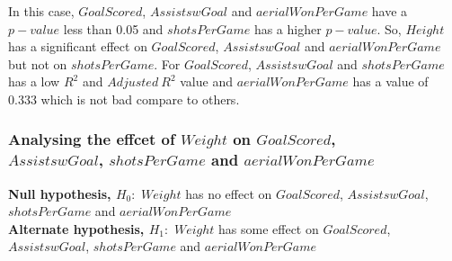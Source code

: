 \documentclass[12pt]{article}
\begin{document}
In this case, $ GoalScored $, $ AssistswGoal $ and $ aerialWonPerGame $ have a $ p-value $ less than 0.05 and $ shotsPerGame $ has a higher $ p-value $. So, $ Height $ has a significant effect on $ GoalScored $, $ AssistswGoal $ and $ aerialWonPerGame $ but not on $ shotsPerGame $. For $ GoalScored $, $ AssistswGoal $ and $ shotsPerGame $ has a low $ R^2 $ and $ Adjusted ~ R^2 $ value and $ aerialWonPerGame $ has a value of 0.333 which is not bad compare to others.

\newpage

\subsubsection{Analysing the effcet of $ Weight $ on $ GoalScored $, \\ $ AssistswGoal $, $ shotsPerGame $ and $ aerialWonPerGame $}

\textbf{Null hypothesis, $ H_0: $} $ Weight $ has no effect on $ GoalScored $, $ AssistswGoal $, $ shotsPerGame $ and $ aerialWonPerGame $\\
\textbf{Alternate hypothesis, $ H_1: $} $ Weight $ has some effect on $ GoalScored $, $ AssistswGoal $, $ shotsPerGame $ and $ aerialWonPerGame $
\end{document}
